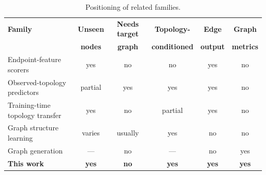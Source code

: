 \begin{table}[t]
\caption{Positioning of related families.}
\label{tab:positioning}
\begin{center}
\small
\begin{tabular}{lccccc}
\toprule
\textbf{Family} & \textbf{Unseen} & \textbf{Needs target} & \textbf{Topology-} & \textbf{Edge} & \textbf{Graph} \\
 & \textbf{nodes} & \textbf{graph} & \textbf{conditioned} & \textbf{output} & \textbf{metrics} \\
\midrule
Endpoint-feature scorers             & yes     & no      & no      & yes & no \\
Observed-topology predictors         & partial & yes     & yes     & yes & no \\
Training-time topology transfer      & yes     & no      & partial & yes & no \\
Graph structure learning             & varies  & usually & yes     & no  & no \\
Graph generation                     & ---     & no      & ---     & no  & yes \\
\midrule
\textbf{This work}                   & \textbf{yes} & \textbf{no} & \textbf{yes} & \textbf{yes} & \textbf{yes} \\
\bottomrule
\end{tabular}
\end{center}
\end{table}

